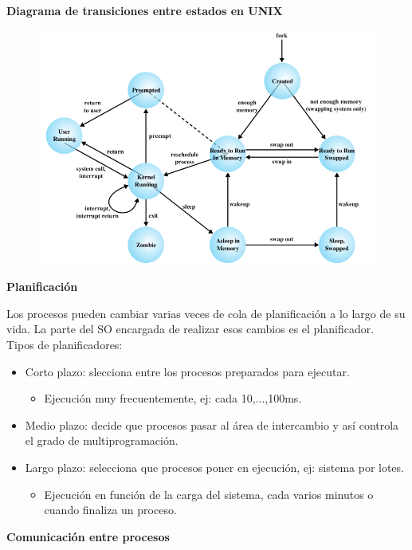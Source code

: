 \documentclass{article}
\begin{document}
\newpage
\textbf{Diagrama de transiciones entre estados en UNIX}
\begin{figure}[h]
\centering
\includegraphics[scale=1, width=\textwidth]{diagrama_transicioens.png}
\end{figure}

\textbf{Planificación}

Los procesos pueden cambiar varias veces de cola de planificación a lo largo de su vida. La parte del SO encargada de realizar esos cambios es el planificador.\\

Tipos de planificadores:
\begin{itemize}
\item Corto plazo: slecciona entre los procesos preparados para ejecutar.
	\begin{itemize}
	\item Ejecución muy frecuentemente, ej: cada 10,...,100ms.
	\end{itemize}
	
\item Medio plazo: decide que procesos pasar al área de intercambio y así controla el grado de multiprogramación.

\item Largo plazo: selecciona que procesos poner en ejecución, ej: sistema por lotes.
	\begin{itemize}
	\item Ejecución en función de la carga del sistema, cada varios minutos o cuando finaliza un proceso.
	\end{itemize}
\end{itemize}

\textbf{Comunicación entre procesos}
\end{document}
